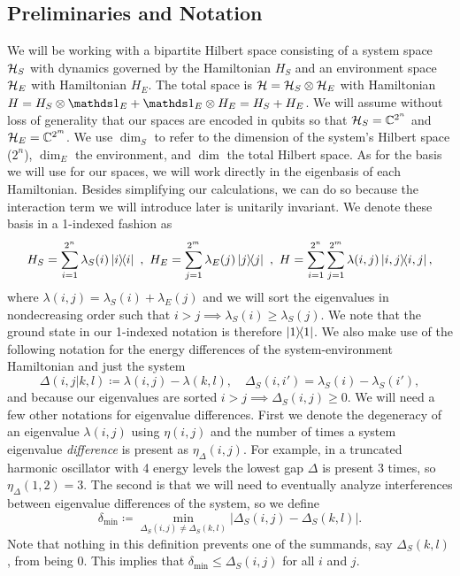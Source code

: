 \subsection{Preliminaries and Notation} \label{sec:prelim}
We will be working with a bipartite Hilbert space consisting of a system space $\mathcal{H}_S$ with dynamics governed by the Hamiltonian $H_S$ and an environment space $\mathcal{H}_E$ with Hamiltonian $H_E$. The total space is $\mathcal{H} = \mathcal{H}_S \otimes \mathcal{H}_E$ with Hamiltonian $H = H_S \otimes \identity_E + \identity_E \otimes H_E = H_S + H_E$. We will assume without loss of generality that our spaces are encoded in qubits so that $\mathcal{H}_S = \mathbb{C}^{2^n}$ and $\mathcal{H}_E = \mathbb{C}^{2^m}$. We use $\dim_S$ to refer to the dimension of the system's Hilbert space ($2^n$), $\dim_E$ the environment, and $\dim$ the total Hilbert space. As for the basis we will use for our spaces, we will work directly in the eigenbasis of each Hamiltonian. Besides simplifying our calculations, we can do so because the interaction term we will introduce later is unitarily invariant. We denote these basis in a 1-indexed fashion as
\begin{equation}
    H_{S} = \sum_{i = 1}^{2^n} \lambda_S(i) \ketbra{i}{i} ~,~ H_{E} = \sum_{j=1}^{2^m } \lambda_E(j) \ketbra{j}{j} ~,~ H = \sum_{i=1}^{2^n } \sum_{j=1}^{2^m } \lambda(i,j) \ketbra{i,j}{i,j},
\end{equation}
where $\lambda(i,j) = \lambda_S(i) + \lambda_E(j)$ and we will sort the eigenvalues in nondecreasing order such that $i > j \implies \lambda_S(i) \geq \lambda_S(j)$. We note that the ground state in our 1-indexed notation is therefore $\ketbra{1}{1}$. We also make use of the following notation for the energy differences of the system-environment Hamiltonian and just the system
\begin{equation}
\Delta(i,j|k,l) \coloneqq \lambda(i,j) - \lambda(k,l), \quad \Delta_S(i,i') = \lambda_S(i) - \lambda_S(i'), \label{eq:delta_def}
\end{equation}
and because our eigenvalues are sorted $i > j \implies \Delta_S(i,j) \geq 0$. We will need a few other notations for eigenvalue differences. First we denote the degeneracy of an eigenvalue $\lambda(i,j)$ using $\eta(i,j)$ and the number of times a system eigenvalue \emph{difference} is present as $\eta_\Delta(i,j)$. For example, in a truncated harmonic oscillator with 4 energy levels the lowest gap $\Delta$ is present 3 times, so $\eta_\Delta(1, 2) = 3$. The second is that we will need to eventually analyze interferences between eigenvalue differences of the system, so we define
\begin{equation}
    \delta_{\min} \coloneqq \min_{\Delta_S(i,j) \neq \Delta_S(k,l)} \left| \Delta_S(i,j) - \Delta_S(k, l) \right|. \label{eq:delta_min_def}
\end{equation}
Note that nothing in this definition prevents one of the summands, say $\Delta_S(k,l)$, from being 0. This implies that $\delta_{\min} \leq \Delta_S(i,j)$ for all $i$ and $j$.

